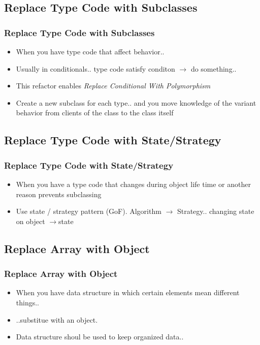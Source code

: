 \documentclass{beamer}
\begin{document}
\subsection{Replace Type Code with Subclasses}
\begin{frame}
  \frametitle{Replace Type Code with Subclasses}
  \begin{itemize}
	\item<+-> When you have type code that affect behavior..
	\item<+-> Usually in conditionals.. type code satisfy conditon $\rightarrow$ do something..
	\item<+-> This refactor enables \textit{Replace Conditional With Polymorphism}
	\item<+-> Create a new subclass for each type.. and you move knowledge of the variant behavior from clients of the class to the class itself 
  \end{itemize}
\end{frame}

\subsection{Replace Type Code with State/Strategy}
\begin{frame}
  \frametitle{Replace Type Code with State/Strategy}
  \begin{itemize}
	\item<+-> When you have a type code that changes during object life time or another reason prevents subclassing
	\item<+-> Use state / strategy pattern (GoF). Algorithm $\rightarrow$ Strategy.. changing state on object $\rightarrow$state
  \end{itemize}
\end{frame}
  
\subsection{Replace Array with Object}
\begin{frame}
  \frametitle{Replace Array with Object}
  \begin{itemize}
	\item<+-> When you have data structure in which certain elements mean different things..
	\item<+-> ..substitue with an object.
	\item<+-> Data structure shoul be used to keep organized data..
  \end{itemize}  
\end{frame}
\end{document}
